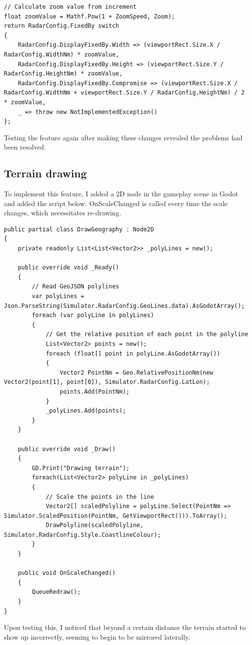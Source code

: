 \documentclass{article}
\begin{document}
\lstset{style=csharp}
\begin{lstlisting}[caption=New calculation of zoom value in scale function]
// Calculate zoom value from increment
float zoomValue = Mathf.Pow(1 + ZoomSpeed, Zoom);
return RadarConfig.FixedBy switch
{
    RadarConfig.DisplayFixedBy.Width => (viewportRect.Size.X / RadarConfig.WidthNm) * zoomValue,
    RadarConfig.DisplayFixedBy.Height => (viewportRect.Size.Y / RadarConfig.HeightNm) * zoomValue,
    RadarConfig.DisplayFixedBy.Compromise => (viewportRect.Size.X / RadarConfig.WidthNm + viewportRect.Size.Y / RadarConfig.HeightNm) / 2 * zoomValue,
    _ => throw new NotImplementedException()
};
\end{lstlisting}
Testing the feature again after making these changes revealed the problems had been resolved.

\subsection{Terrain drawing}
To implement this feature, I added a 2D node in the gameplay scene in Godot and added the script below.
OnScaleChanged is called every time the scale changes, which necessitates re-drawing.
\lstset{style=csharp}
\begin{lstlisting}[caption=Geography drawing script]
public partial class DrawGeography : Node2D
{
	private readonly List<List<Vector2>> _polyLines = new();

	public override void _Ready()
	{
		// Read GeoJSON polylines
		var polyLines = Json.ParseString(Simulator.RadarConfig.GeoLines.data).AsGodotArray();
		foreach (var polyLine in polyLines)
		{
			// Get the relative position of each point in the polyline
			List<Vector2> points = new();
			foreach (float[] point in polyLine.AsGodotArray())
			{
				Vector2 PointNm = Geo.RelativePositionNm(new Vector2(point[1], point[0]), Simulator.RadarConfig.LatLon);
				points.Add(PointNm);
			}
			_polyLines.Add(points);
		}
	}

	public override void _Draw()
	{
		GD.Print("Drawing terrain");
		foreach(List<Vector2> polyLine in _polyLines)
		{
			// Scale the points in the line
			Vector2[] scaledPolyline = polyLine.Select(PointNm => Simulator.ScaledPosition(PointNm, GetViewportRect())).ToArray();
			DrawPolyline(scaledPolyline, Simulator.RadarConfig.Style.CoastlineColour);
		}
	}

	public void OnScaleChanged()
	{
		QueueRedraw();
	}
}
\end{lstlisting}
Upon testing this, I noticed that beyond a certain distance the terrain started to show up incorrectly, seeming to begin to be mirrored laterally.
\end{document}
